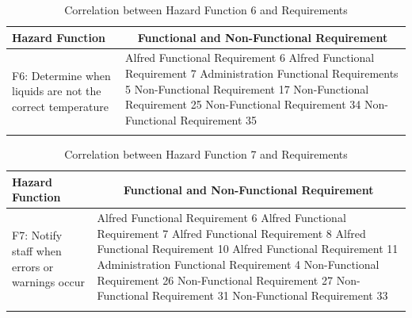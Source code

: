 \documentclass [10pt]{article}
\begin{document}

\begin{longtable}{| p{ } | p{ } |}
\hline 
\centering \textbf{Hazard Function} & 
\multicolumn{1}{c}{\textbf {Functional and Non-Functional Requirement}}\\ \hline
\multirow{6}{*}{F6: Determine when liquids are not the correct temperature} & 
		{Alfred Functional Requirement 6 \newline
		Alfred Functional Requirement 7 \newline
		Administration Functional Requirements 5 \newline
		Non-Functional Requirement 17 \newline
		Non-Functional Requirement 25 \newline
		Non-Functional Requirement 34 \newline
		Non-Functional Requirement 35} \\ 
\hline 
\caption{Correlation between Hazard Function 6 and Requirements}  
\end{longtable}


\begin{longtable}{| p{ } | p{ } |}
\hline 
\centering \textbf{Hazard Function} & 
\multicolumn{1}{c}{\textbf {Functional and Non-Functional Requirement}}\\ \hline
\multirow{8}{*}{F7: Notify staff when errors or warnings occur} & 
		{Alfred Functional Requirement 6 \newline
		Alfred Functional Requirement 7 \newline
		Alfred Functional Requirement 8 \newline
		Alfred Functional Requirement 10 \newline
		Alfred Functional Requirement 11 \newline
		Administration Functional Requirement 4 \newline
		Non-Functional Requirement 26 \newline
		Non-Functional Requirement 27 \newline
		Non-Functional Requirement 31 \newline
		Non-Functional Requirement 33} \\ 
\hline 
\caption{Correlation between Hazard Function 7 and Requirements}  
\end{longtable}
\end{document}
